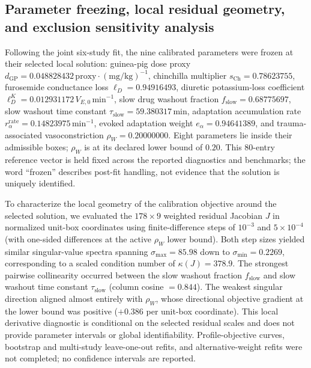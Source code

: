 \documentclass[final,5p,times]{elsarticle}
\begin{document}
\subsection{Parameter freezing, local residual geometry, and exclusion sensitivity analysis}\label{sec:calibration-freeze}

Following the joint six-study fit, the nine calibrated parameters were frozen at their selected local solution: guinea-pig dose proxy \(d_{\mathrm{GP}} = 0.048828432\,\mathrm{proxy}\cdot(\mathrm{mg/kg})^{-1}\), chinchilla multiplier \(s_{\mathrm{Ch}} = 0.78623755\), furosemide conductance loss \(\ell_D = 0.94916493\), diuretic potassium-loss coefficient \(\ell_D^K = 0.012931172\,V_{E,0}\,\mathrm{min}^{-1}\), slow drug washout fraction \(f_{\mathrm{slow}} = 0.68775697\), slow washout time constant \(\tau_{\mathrm{slow}} = 59.380317\,\mathrm{min}\), adaptation accumulation rate \(r_\alpha^{\mathrm{rate}} = 0.14823975\,\mathrm{min}^{-1}\), evoked adaptation weight \(e_\alpha = 0.94641389\), and trauma-associated vasoconstriction \(\rho_W = 0.20000000\). Eight parameters lie inside their admissible boxes; \(\rho_W\) is at its declared lower bound of \(0.20\). This 80-entry reference vector is held fixed across the reported diagnostics and benchmarks; the word ``frozen'' describes post-fit handling, not evidence that the solution is uniquely identified.

To characterize the local geometry of the calibration objective around the selected solution, we evaluated the \(178 \times 9\) weighted residual Jacobian \(J\) in normalized unit-box coordinates using finite-difference steps of \(10^{-3}\) and \(5 \times 10^{-4}\) (with one-sided differences at the active \(\rho_W\) lower bound). Both step sizes yielded similar singular-value spectra spanning \(\sigma_{\max} = 85.98\) down to \(\sigma_{\min} = 0.2269\), corresponding to a scaled condition number of \(\kappa(J) = 378.9\). The strongest pairwise collinearity occurred between the slow washout fraction \(f_{\mathrm{slow}}\) and slow washout time constant \(\tau_{\mathrm{slow}}\) (column cosine \(= 0.844\)). The weakest singular direction aligned almost entirely with \(\rho_W\), whose directional objective gradient at the lower bound was positive (\(+0.386\) per unit-box coordinate). This local derivative diagnostic is conditional on the selected residual scales and does not provide parameter intervals or global identifiability. Profile-objective curves, bootstrap and multi-study leave-one-out refits, and alternative-weight refits were not completed; no confidence intervals are reported.
\end{document}
